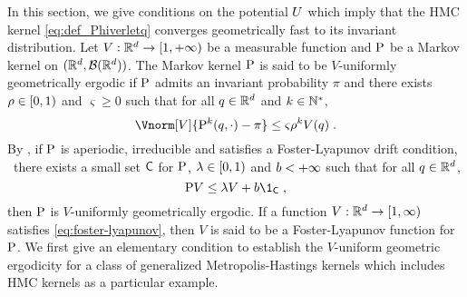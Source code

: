


In this section, we give conditions on the potential $U$ which imply that
the HMC kernel \eqref{eq:def_Phiverletq} converges geometrically fast to its invariant distribution.
Let $V: \mathbb{R}^d \to \left[1,+\infty\right)$ be a measurable function and $\mathrm{P}$
be a Markov kernel on $(\mathbb{R}^d,\mathcal{B}(\mathbb{R}^d))$. The Markov kernel $\mathrm{P}$ is said to
be $V$-uniformly geometrically ergodic if $\mathrm{P}$ admits an invariant probability $\pi$
and there exists $\rho \in \left[0,1\right)$
and $\varsigma \geq 0$ such that for all $q \in \mathbb{R}^d$ and $k \in \mathbb{N}^*$,
\begin{equation}
  \Vnorm[V]{\Pker^k(\q,\cdot)-\pi} \leq \varsigma \rho^{k} V(\q) \eqsp.
\end{equation}
By \cite[Theorem 16.0.1]{meyn:tweedie:2009}, if $\mathrm{P}$ is aperiodic, irreducible and satisfies a Foster-Lyapunov drift condition, \ie~there exists a small set $\mathsf{C}$ for $\mathrm{P}$, $\lambda \in \left[0,1\right)$ and $b < +\infty$ such that for all $q \in \mathbb{R}^d$,
\begin{equation}
\label{eq:foster-lyapunov}
\Pker V  \leq \lambda V + b \1_{\Csf} \eqsp,
\end{equation}
then $\mathrm{P}$ is $V$-uniformly geometrically ergodic. If a function $V : \mathbb{R}^d \to \left[1,\infty\right)$
satisfies \eqref{eq:foster-lyapunov}, then $V$ is said to be a Foster-Lyapunov function for $\mathrm{P}$.
We first give an elementary condition to establish the $V$-uniform geometric
ergodicity for a class of generalized Metropolis-Hastings  kernels which includes HMC kernels as a particular example.


